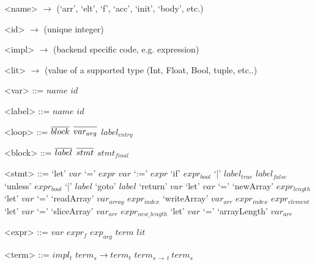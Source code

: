 \documentclass[preamble.tex]{subfiles}
\begin{document}

\setlength{\grammarindent}{5em} %
\renewcommand{\syntleft}{\normalfont\itshape} %
\renewcommand{\syntright}{}
\renewcommand{\litleft}{\ttfamily} %
\renewcommand{\litright}{}
\newcommand{\many}[1]{\overline{#1\vphantom{dummy}}} %

\renewcommand\t[1]{\mathit{#1}}

\setlength{\grammarparsep}{0pt} %

\begin{grammar}
<name> $\rightarrow$ (`arr', `elt', `f', `acc', `init', `body', etc.)

<id>   $\rightarrow$ (unique integer\footnotemark)

<impl> $\rightarrow$ (backend specific code, e.g.  expression)

<lit>  $\rightarrow$ (\Haskell value of a supported type (Int, Float, Bool, tuple, etc..)

<var>  ::= $name$ $id$

<label> ::= $name$ $id$

\end{grammar}

\setlength{\grammarparsep}{10pt plus 1pt minus 1pt} %
\begin{grammar}
<loop> ::= $\many{block}$ $\many{var_{arg}}$ $label_{entry}$

<block> ::= $\many{label}$ $\many{stmt}$ $stmt_\t{final}$

<stmt> ::= `let' $var$ `=' $expr$
      \alt $var$ `:=' $expr$
      \alt `if' $expr_{bool}$ `|' $label_{true}$ $label_\t{false}$
      \alt `unless' $expr_{bool}$ `|' $label$
      \alt `goto' $label$
      \alt `return' $var$
      \alt `let' $var$ `=' `newArray' $expr_{length}$
      \alt `let' $var$ `=' `readArray' $var_{array}$ $expr_{index}$
      \alt `writeArray' $var_{arr}$ $expr_{index}$ $expr_{element}$
      \alt `let' $var$ `=' `sliceArray' $var_{arr}$ $expr_{new\_length}$
      \alt `let' $var$ `=' `arrayLength' $var_{arr}$

<expr> ::= $var$
      \alt $expr_{\mathit{f}}$ $exp_{arg}$
      \alt $term$
      \alt $lit$

<term> ::= $impl_{t}$
      \alt $term_{s} \rightarrow term_{t}$
      \alt $term_{s\, \rightarrow\, t}\ term_{s}$

\end{grammar}
\end{document}
